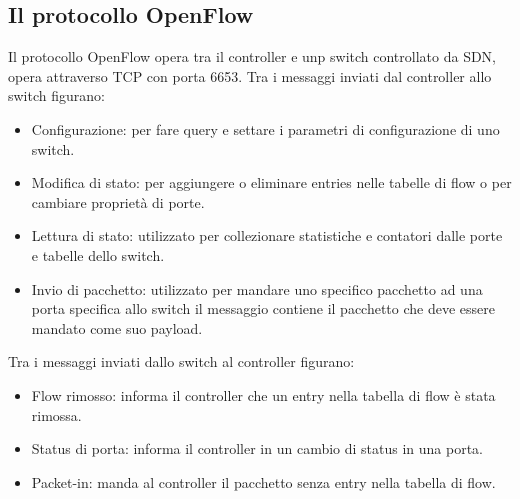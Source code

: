 \subsection{Il protocollo OpenFlow}
Il protocollo OpenFlow opera tra il controller e unp switch controllato da SDN, opera attraverso TCP con porta 6653. Tra i messaggi inviati dal controller
allo switch figurano:
\begin{itemize}
\item Configurazione: per fare query e settare i parametri di configurazione di uno switch.
\item Modifica di stato: per aggiungere o eliminare entries nelle tabelle di flow o per cambiare propriet\`a di porte.
\item Lettura di stato: utilizzato per collezionare statistiche e contatori dalle porte e tabelle dello switch. 
\item Invio di pacchetto: utilizzato per mandare uno specifico pacchetto ad una porta specifica allo switch il messaggio contiene il pacchetto che deve 
essere mandato come suo payload.
\end{itemize}
Tra i messaggi inviati dallo switch al controller figurano:
\begin{itemize}
\item Flow rimosso: informa il controller che un entry nella tabella di flow \`e stata rimossa. 
\item Status di porta: informa il controller in un cambio di status in una porta.
\item Packet-in: manda al controller il pacchetto senza entry nella tabella di flow. 
\end{itemize}
